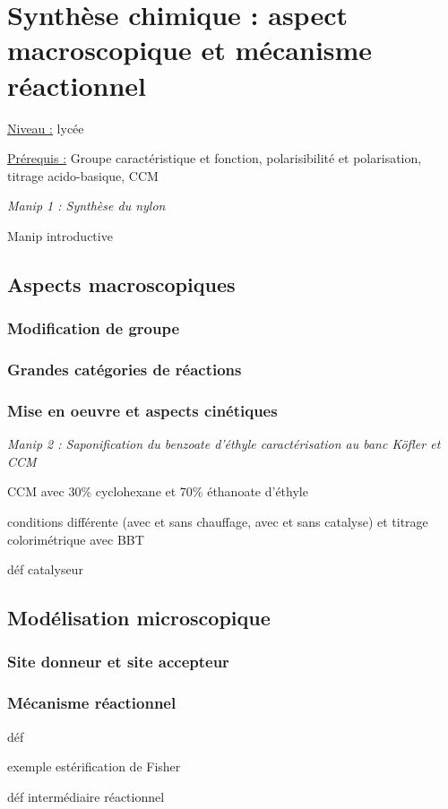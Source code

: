 \documentclass{article}%
\begin{document}
\section{Synthèse chimique : aspect macroscopique et mécanisme réactionnel}
\underline{Niveau :} lycée

\underline{Prérequis :} Groupe caractéristique et fonction, polarisibilité et polarisation, titrage acido-basique, CCM

\textit{Manip 1 : Synthèse du nylon}

Manip introductive
\subsection{Aspects macroscopiques}
\subsubsection{Modification de groupe}
\subsubsection{Grandes catégories de réactions}
\subsubsection{Mise en oeuvre et aspects cinétiques}

\textit{Manip 2 : Saponification du benzoate d’éthyle caractérisation au banc Köfler et CCM}

CCM avec 30\% cyclohexane et 70\% éthanoate d'éthyle

conditions différente (avec et sans chauffage, avec et sans catalyse) et titrage colorimétrique avec BBT 

déf catalyseur
\subsection{Modélisation microscopique}
\subsubsection{Site donneur et site accepteur}
\subsubsection{Mécanisme réactionnel}
déf

exemple estérification de Fisher

déf intermédiaire réactionnel
\end{document}
